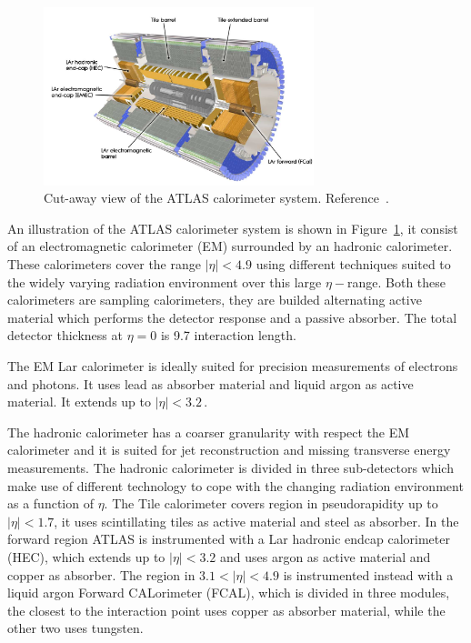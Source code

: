 \begin{figure}[tp]
     \begin{center}

            \includegraphics[width=0.7\textwidth]{figure/Calo.png}

    \end{center}
    \caption{Cut-away view of the ATLAS calorimeter system. Reference~\cite{ATLASDetector}.}



   \label{fig:atlasCal}
\end{figure}

An illustration of the ATLAS calorimeter system is shown in Figure~\ref{fig:atlasCal}, it consist of an electromagnetic calorimeter (EM) surrounded by an hadronic 
calorimeter.  These calorimeters cover the range $|\eta| < 4.9$ using different techniques suited to the
widely varying  radiation environment over this large $\eta-$range. Both these calorimeters are sampling calorimeters, they are builded alternating
active material which performs the detector response and a passive absorber.
The total detector thickness at $\eta = 0$ is 9.7 interaction length. 

The EM Lar calorimeter is ideally suited for precision measurements of electrons and photons.  It uses lead as absorber material and liquid argon 
as active material. It extends up to $|\eta| < 3.2\,.$

The hadronic calorimeter has a coarser granularity with respect the EM calorimeter and it is suited  for
jet reconstruction and missing transverse energy measurements. The hadronic calorimeter is divided in three sub-detectors which make use of different technology to cope 
with the changing radiation environment as a function of $\eta$. The Tile calorimeter covers region in pseudorapidity up to $|\eta| < 1.7$, it uses 
scintillating tiles as active material and steel as absorber. 
In the forward region ATLAS is instrumented with a Lar hadronic endcap calorimeter (HEC),
which extends up to $|\eta| < 3.2$ and uses argon as active material and copper as absorber. The region in $3.1 <|\eta| < 4.9$ is instrumented instead with a 
liquid argon Forward CALorimeter (FCAL), 
which is divided in three modules, the closest to the interaction point uses 
copper as absorber material, while the other two uses tungsten.



